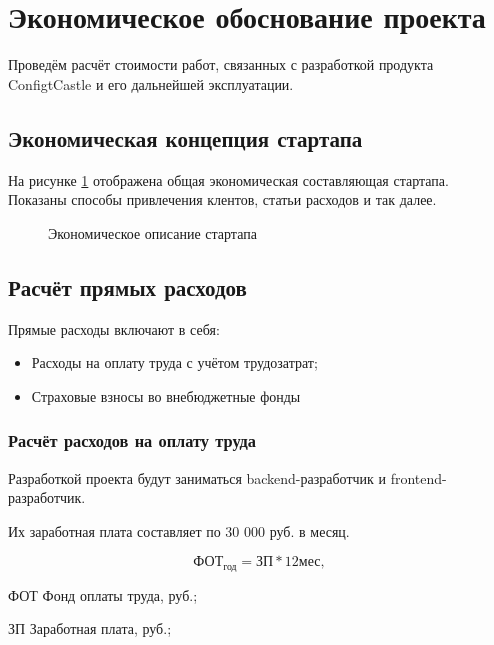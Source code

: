 \section{Экономическое обоснование проекта}

Проведём расчёт стоимости работ, связанных с разработкой
продукта ConfigtCastle и его дальнейшей эксплуатации.

\tocless\subsection{Экономическая концепция стартапа}

На рисунке \ref{ec:canvas} отображена общая экономическая составляющая стартапа.
Показаны способы привлечения клентов, статьи расходов и так далее.

\begin{figure}[H]
    \caption{Экономическое описание стартапа}
    \label{ec:canvas}
\end{figure}

\tocless\subsection{Расчёт прямых расходов}

Прямые расходы включают в себя:
\begin{itemize}
    \item Расходы на оплату труда с учётом трудозатрат;
    \item Страховые взносы во внебюджетные фонды
\end{itemize}

\subsubsection{Расчёт расходов на оплату труда}

Разработкой проекта будут заниматься backend-разработчик и
frontend-разработчик.

Их заработная плата составляет по 30 000 руб. в месяц.

\begin{equation}
   \text{ФОТ}_\text{год} = \text{ЗП} * 12 \text{мес},
\end{equation}

\begin{eqexpl}[5ex]
    \item{ФОТ} Фонд оплаты труда, руб.;
    \item{ЗП} Заработная плата, руб.;
\end{eqexpl}

